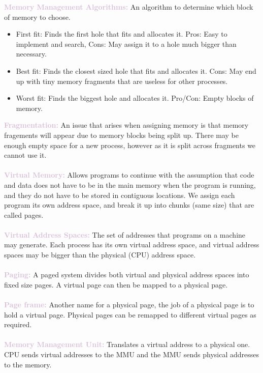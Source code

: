 \documentclass[a4paper,10pt]{article}
\begin{document}
\textcolor{Thistle}{\textbf{Memory Management Algorithms:}} An algorithm to determine which block of memory to choose. 
\begin{itemize}
\item First fit: Finds the first hole that fits and allocates it. Pros: Easy to implement and search, Cons: May assign it to a hole much bigger than necessary. 
\item Best fit: Finds the closest sized hole that fits and allocates it. Cons: May end up with tiny memory fragments that are useless for other processes. 
\item Worst fit: Finds the biggest hole and allocates it. Pro/Con: Empty blocks of memory. 
\end{itemize}
\textcolor{Thistle}{\textbf{Fragmentation: }} An issue that arises when assigning memory is that memory fragements will appear due to memory blocks being split up. There may be enough empty space for a new process, however as it is split across fragments we cannot use it. \\\\
\textcolor{Thistle}{\textbf{Virtual Memory:}} Allows programs to continue with the assumption that code and data does not have to be in the main memory when the program is running, and they do not have to be stored in contiguous locations. We assign each program its own address space, and break it up into chunks (same size) that are called pages. \\\\
\textcolor{Thistle}{\textbf{Virtual Address Spaces:}} The set of addresses that programs on a machine may generate. Each process has its own virtual address space, and virtual address spaces may be bigger than the physical (CPU) address space. \\\\
\textcolor{Thistle}{\textbf{Paging:}} A paged system divides both virtual and physical address spaces into fixed size pages. A virtual page can then be mapped to a physical page. \\\\
\textcolor{Thistle}{\textbf{Page frame:}} Another name for a physical page, the job of a physical page is to hold a virtual page. Physical pages can be remapped to different virtual pages as required.\\\\
\textcolor{Thistle}{\textbf{Memory Management Unit: }} Translates a virtual address to a physical one. CPU sends virtual addresses to the MMU and the MMU sends physical addresses to the memory. \\\\
\end{document}
